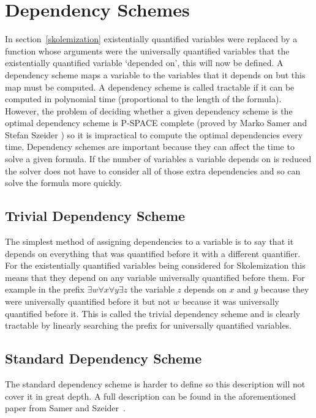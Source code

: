 \section{Dependency Schemes} \label{dependencyschemes}
In section~\ref{skolemization} existentially quantified variables were replaced by a function whose arguments were the universally quantified variables that the existentially quantified variable `depended on', this will now be defined. A dependency scheme maps a variable to the variables that it depends on but this map must be computed. A dependency scheme is called tractable if it can be computed in polynomial time (proportional to the length of the formula). However, the problem of deciding whether a given dependency scheme is the optimal dependency scheme is P-SPACE complete (proved by Marko Samer and Stefan Szeider \cite{samer2009backdoor}) so it is impractical to compute the optimal dependencies every time.
Dependency schemes are important because they can affect the time to solve a given formula. If the number of variables a variable depends on is reduced the solver does not have to consider all of those extra dependencies and so can solve the formula more quickly.

\subsection{Trivial Dependency Scheme}
The simplest method of assigning dependencies to a variable is to say that it depends on everything that was quantified before it with a different quantifier. For the existentially quantified variables being considered for Skolemization this means that they depend on any variable universally quantified before them. For example in the prefix $\exists w \forall x \forall y \exists z$ the variable $z$ depends on $x$ and $y$ because they were universally quantified before it but not $w$ because it was universally quantified before it. This is called the trivial dependency scheme and is clearly tractable by linearly searching the prefix for universally quantified variables.

\subsection{Standard Dependency Scheme} \label{stddepscheme}
The standard dependency scheme is harder to define so this description will not cover it in great depth. A full description can be found in the aforementioned paper from Samer and Szeider~\cite{samer2009backdoor}.

